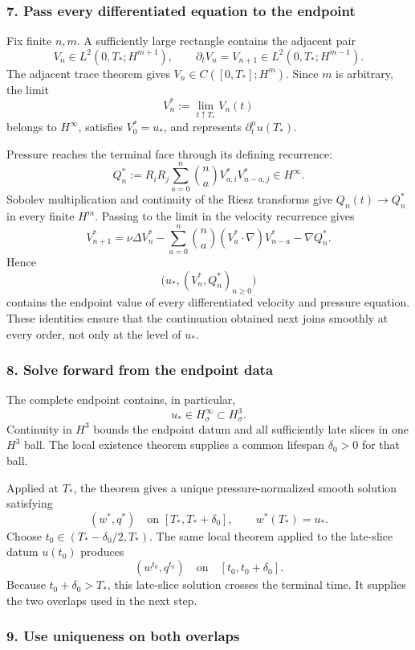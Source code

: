 \documentclass[11pt]{article}
\theoremstyle{definition}
\theoremstyle{remark}
\begin{document}
\subsubsection*{7. Pass every differentiated equation to the endpoint}

Fix finite \(n,m\).  A sufficiently large rectangle contains the adjacent
pair
\[
V_n\in L^2(0,T_*;H^{m+1}),
\qquad
\partial_tV_n=V_{n+1}\in L^2(0,T_*;H^{m-1}).
\]
The adjacent trace theorem gives \(V_n\in C([0,T_*];H^m)\).  Since \(m\) is
arbitrary, the limit
\[
V_n^*:=\lim_{t\uparrow T_*}V_n(t)
\]
belongs to \(H^\infty\), satisfies \(V_0^*=u_*\), and represents
\(\partial_t^n u(T_*)\).

Pressure reaches the terminal face through its defining recurrence:
\[
Q_n^*
:=R_iR_j\sum_{a=0}^{n}\binom na V_{a,i}^*V_{n-a,j}^*
\in H^\infty.
\]
Sobolev multiplication and continuity of the Riesz transforms give
\(Q_n(t)\to Q_n^*\) in every finite \(H^m\).  Passing to the limit in the
velocity recurrence gives
\[
V_{n+1}^*
=\nu\Delta V_n^*
-\sum_{a=0}^{n}\binom na(V_a^*\cdot\nabla)V_{n-a}^*
-\nabla Q_n^*.
\]
Hence
\[
\bigl(u_*,(V_n^*,Q_n^*)_{n\ge0}\bigr)
\]
contains the endpoint value of every differentiated velocity and pressure
equation.  These identities ensure that the continuation obtained next joins
smoothly at every order, not only at the level of \(u_*\).

\subsubsection*{8. Solve forward from the endpoint data}

The complete endpoint contains, in particular,
\[
u_*\in H^\infty_\sigma\subset H^3_\sigma.
\]
Continuity in \(H^3\) bounds the endpoint datum and all sufficiently late
slices in one \(H^3\) ball.  The local existence theorem supplies a common
lifespan \(\delta_0>0\) for that ball.

Applied at \(T_*\), the theorem gives a unique pressure-normalized smooth
solution satisfying
\[
(w^*,q^*)\quad\text{on }[T_*,T_*+\delta_0],
\qquad
w^*(T_*)=u_*.
\]
Choose \(t_0\in(T_* - \delta_0/2,T_*)\).  The same local theorem applied to
the late-slice datum \(u(t_0)\) produces
\[
(w^{t_0},q^{t_0})
\quad\text{on}\quad
[t_0,t_0+\delta_0].
\]
Because \(t_0+\delta_0>T_*\), this late-slice solution crosses the terminal
time.  It supplies the two overlaps used in the next step.

\subsubsection*{9. Use uniqueness on both overlaps}
\end{document}
